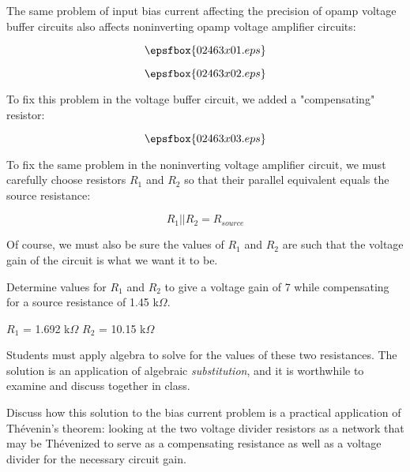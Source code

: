 

The same problem of input bias current affecting the precision of opamp voltage buffer circuits also affects noninverting opamp voltage amplifier circuits:

$$\epsfbox{02463x01.eps}$$

$$\epsfbox{02463x02.eps}$$

To fix this problem in the voltage buffer circuit, we added a "compensating" resistor:

$$\epsfbox{02463x03.eps}$$

To fix the same problem in the noninverting voltage amplifier circuit, we must carefully choose resistors $R_1$ and $R_2$ so that their parallel equivalent equals the source resistance:

$$R_1 || R_2 = R_{source}$$

Of course, we must also be sure the values of $R_1$ and $R_2$ are such that the voltage gain of the circuit is what we want it to be.

Determine values for $R_1$ and $R_2$ to give a voltage gain of 7 while compensating for a source resistance of 1.45 k$\Omega$.







$R_1$ = 1.692 k$\Omega$ \hskip 50pt $R_2$ = 10.15 k$\Omega$







Students must apply algebra to solve for the values of these two resistances.  The solution is an application of algebraic {\it substitution}, and it is worthwhile to examine and discuss together in class.

Discuss how this solution to the bias current problem is a practical application of Th\'evenin's theorem: looking at the two voltage divider resistors as a network that may be Th\'evenized to serve as a compensating resistance as well as a voltage divider for the necessary circuit gain.




